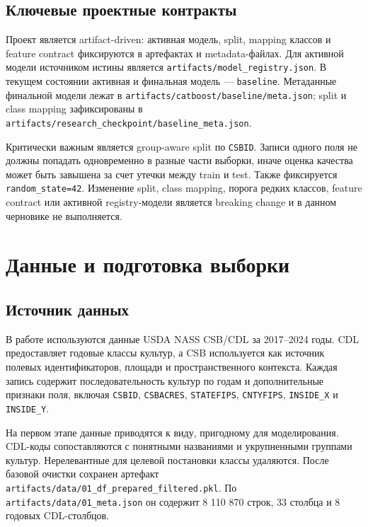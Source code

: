 \documentclass[a4paper,article,14pt]{extarticle}
\begin{document}
\subsection{Ключевые проектные контракты}

Проект является artifact-driven: активная модель, split, mapping классов и feature contract фиксируются в артефактах и metadata-файлах. Для активной модели источником истины является \texttt{artifacts/model\_registry.json}. В текущем состоянии активная и финальная модель --- \texttt{baseline}. Метаданные финальной модели лежат в \texttt{artifacts/catboost/baseline/meta.json}; split и class mapping зафиксированы в \texttt{artifacts/research\_checkpoint/baseline\_meta.json}.

Критически важным является group-aware split по \texttt{CSBID}. Записи одного поля не должны попадать одновременно в разные части выборки, иначе оценка качества может быть завышена за счет утечки между train и test. Также фиксируется \texttt{random\_state=42}. Изменение split, class mapping, порога редких классов, feature contract или активной registry-модели является breaking change и в данном черновике не выполняется.

\section{Данные и подготовка выборки}

\subsection{Источник данных}

В работе используются данные USDA NASS CSB/CDL за 2017--2024 годы. CDL предоставляет годовые классы культур, а CSB используется как источник полевых идентификаторов, площади и пространственного контекста. Каждая запись содержит последовательность культур по годам и дополнительные признаки поля, включая \texttt{CSBID}, \texttt{CSBACRES}, \texttt{STATEFIPS}, \texttt{CNTYFIPS}, \texttt{INSIDE\_X} и \texttt{INSIDE\_Y}.

На первом этапе данные приводятся к виду, пригодному для моделирования. CDL-коды сопоставляются с понятными названиями и укрупненными группами культур. Нерелевантные для целевой постановки классы удаляются. После базовой очистки сохранен артефакт \texttt{artifacts/data/01\_df\_prepared\_filtered.pkl}. По \texttt{artifacts/data/01\_meta.json} он содержит 8 110 870 строк, 33 столбца и 8 годовых CDL-столбцов.
\end{document}
